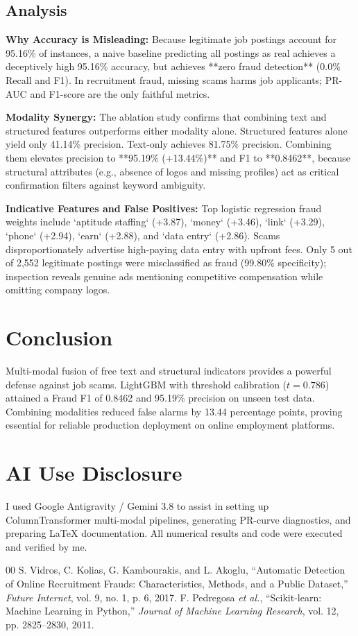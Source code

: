 \documentclass[conference,10pt]{IEEEtran}
\begin{document}
\subsection{Analysis}
\textbf{Why Accuracy is Misleading:} Because legitimate job postings account for 95.16\% of instances, a naive baseline predicting all postings as real achieves a deceptively high 95.16\% accuracy, but achieves **zero fraud detection** (0.0\% Recall and F1). In recruitment fraud, missing scams harms job applicants; PR-AUC and F1-score are the only faithful metrics.

\textbf{Modality Synergy:} The ablation study confirms that combining text and structured features outperforms either modality alone. Structured features alone yield only 41.14\% precision. Text-only achieves 81.75\% precision. Combining them elevates precision to **95.19\% (+13.44\%)** and F1 to **0.8462**, because structural attributes (e.g., absence of logos and missing profiles) act as critical confirmation filters against keyword ambiguity.

\textbf{Indicative Features and False Positives:} Top logistic regression fraud weights include `aptitude staffing` (+3.87), `money` (+3.46), `link` (+3.29), `phone` (+2.94), `earn` (+2.88), and `data entry` (+2.86). Scams disproportionately advertise high-paying data entry with upfront fees. Only 5 out of 2,552 legitimate postings were misclassified as fraud (99.80\% specificity); inspection reveals genuine ads mentioning competitive compensation while omitting company logos.

\section{Conclusion}
Multi-modal fusion of free text and structural indicators provides a powerful defense against job scams. LightGBM with threshold calibration ($t = 0.786$) attained a Fraud F1 of 0.8462 and 95.19\% precision on unseen test data. Combining modalities reduced false alarms by 13.44 percentage points, proving essential for reliable production deployment on online employment platforms.

\section*{AI Use Disclosure}
I used Google Antigravity / Gemini 3.8 to assist in setting up ColumnTransformer multi-modal pipelines, generating PR-curve diagnostics, and preparing LaTeX documentation. All numerical results and code were executed and verified by me.

\begin{thebibliography}{00}
 S. Vidros, C. Kolias, G. Kambourakis, and L. Akoglu, ``Automatic Detection of Online Recruitment Frauds: Characteristics, Methods, and a Public Dataset,'' \textit{Future Internet}, vol. 9, no. 1, p. 6, 2017.
 F. Pedregosa \textit{et al.}, ``Scikit-learn: Machine Learning in Python,'' \textit{Journal of Machine Learning Research}, vol. 12, pp. 2825--2830, 2011.
\end{thebibliography}
\end{document}
